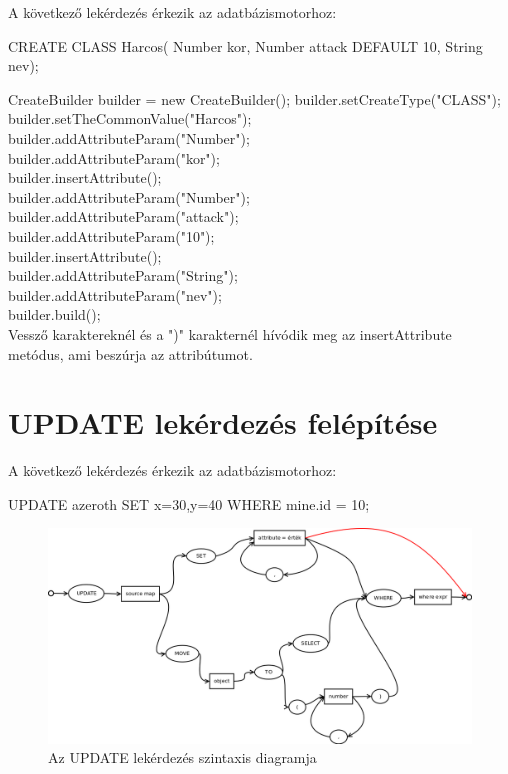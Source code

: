 A következő lekérdezés érkezik az adatbázismotorhoz:
\begin{sql}
CREATE CLASS Harcos(
Number kor,
Number attack DEFAULT 10,
String nev);
\end{sql}

CreateBuilder builder = new CreateBuilder();
builder.setCreateType("CLASS"); \\
builder.setTheCommonValue("Harcos"); \\
builder.addAttributeParam("Number"); \\
builder.addAttributeParam("kor"); \\
builder.insertAttribute(); \\
builder.addAttributeParam("Number"); \\
builder.addAttributeParam("attack"); \\
builder.addAttributeParam("10"); \\
builder.insertAttribute(); \\
builder.addAttributeParam("String"); \\
builder.addAttributeParam("nev"); \\
builder.build(); \\

Vessző karaktereknél és a ")" karakternél hívódik meg az insertAttribute metódus, ami beszúrja az attribútumot.


\section{UPDATE lekérdezés felépítése}

A következő lekérdezés érkezik az adatbázismotorhoz:
\begin{sql}
UPDATE azeroth SET x=30,y=40 WHERE mine.id = 10;
\end{sql}

\begin{figure}[htb]
	\begin{center}
		\includegraphics[scale=0.4]{images/update}
		\caption{Az UPDATE lekérdezés szintaxis diagramja}
		\label{fig:updateSytnax}
	\end{center}
\end{figure}

